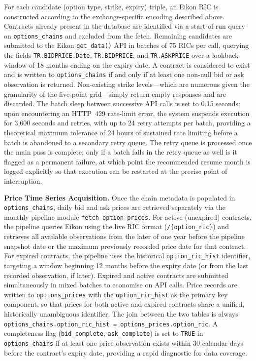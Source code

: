 \documentclass[12pt]{article}
\begin{document}
For each candidate (option type, strike, expiry) triple, an Eikon RIC is
constructed according to the exchange-specific encoding described above.
Contracts already present in the database are identified via a start-of-run
query on \texttt{options\_chains} and excluded from the fetch. Remaining
candidates are submitted to the Eikon \texttt{get\_data()} API in batches of 75
RICs per call, querying the fields \texttt{TR.BIDPRICE.Date},
\texttt{TR.BIDPRICE}, and \texttt{TR.ASKPRICE} over a lookback window of 18
months ending on the expiry date. A contract is considered to exist and is
written to \texttt{options\_chains} if and only if at least one non-null bid or
ask observation is returned. Non-existing strike levels---which are numerous
given the granularity of the five-point grid---simply return empty responses
and are discarded. The batch sleep between successive API calls is set to 0.15
seconds; upon encountering an HTTP~429 rate-limit error, the system suspends
execution for 3{,}600 seconds and retries, with up to 24 retry attempts per
batch, providing a theoretical maximum tolerance of 24 hours of sustained rate
limiting before a batch is abandoned to a secondary retry queue. The retry
queue is processed once the main pass is complete; only if a batch fails in
the retry queue as well is it flagged as a permanent failure, at which point
the recommended resume month is logged explicitly so that execution can be
restarted at the precise point of interruption.

\bigskip

\noindent\textbf{Price Time Series Acquisition.}
Once the chain metadata is populated in \texttt{options\_chains}, daily bid and
ask prices are retrieved separately via the monthly pipeline module
\texttt{fetch\_option\_prices}. For active (unexpired) contracts, the pipeline
queries Eikon using the live RIC format (\texttt{/\{option\_ric\}}) and
retrieves all available observations from the later of one year before the
pipeline snapshot date or the maximum previously recorded price date for that
contract. For expired contracts, the pipeline uses the historical
\texttt{option\_ric\_hist} identifier, targeting a window beginning 12 months
before the expiry date (or from the last recorded observation, if later).
Expired and active contracts are submitted simultaneously in mixed batches to
economise on API calls. Price records are written to \texttt{options\_prices}
with the \texttt{option\_ric\_hist} as the primary key component, so that
prices for both active and expired contracts share a unified, historically
unambiguous identifier. The join between the two tables is always
\texttt{options\_chains.option\_ric\_hist = options\_prices.option\_ric}.
A completeness flag (\texttt{bid\_complete}, \texttt{ask\_complete}) is
set to \texttt{TRUE} in \texttt{options\_chains} if at least one price
observation exists within 30 calendar days before the contract's expiry date,
providing a rapid diagnostic for data coverage.
\end{document}
